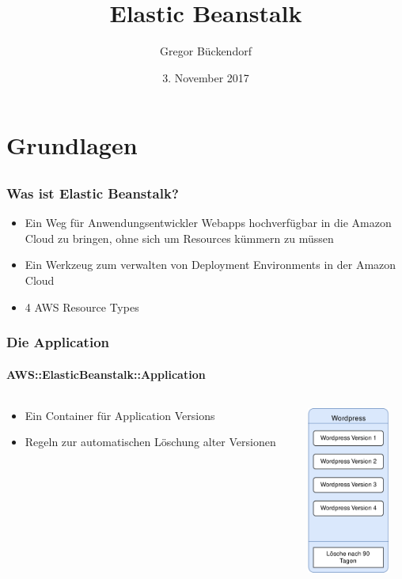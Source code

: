 \documentclass[aspectratio=169,grey,smaller]{beamer}
\title{Elastic Beanstalk}
\date{3. November 2017}
\author{Gregor Bückendorf}
\begin{document}
\begin{frame}
  \titlepage
\end{frame}

\section{Grundlagen}
\subsection{}

\begin{frame}
  \frametitle{Was ist Elastic Beanstalk?}
  \begin{itemize}
  \item<2-> Ein Weg für Anwendungsentwickler Webapps hochverfügbar in die Amazon Cloud zu bringen, ohne sich um Resources kümmern zu müssen
  \item<3-> Ein Werkzeug zum verwalten von Deployment Environments in der Amazon Cloud
  \item<4-> 4 AWS Resource Types
  \end{itemize}
\end{frame}

\begin{frame}
  \frametitle{Die Application}
  \framesubtitle{AWS::ElasticBeanstalk::Application}
  \begin{columns}
  \begin{column}{.48\textwidth}
  \begin{itemize}
  \item<2-> Ein Container für Application Versions
  \item<3-> Regeln zur automatischen Löschung alter Versionen
  \end{itemize}
  \end{column}
  \begin{column}{.48\textwidth}
  \begin{flushright}
  \includegraphics[height=5.5cm]{application}
  \end{flushright}
  \end{column}
  \end{columns}
\end{frame}
\end{document}
